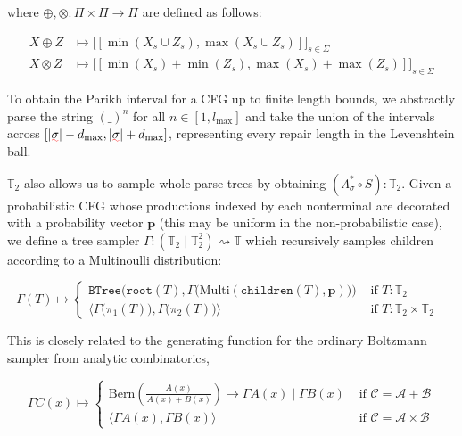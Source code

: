 \documentclass[sigplan,review,anonymous,acmsmall]{acmart}\settopmatter{printfolios=false,printccs=false,printacmref=false}
\begin{document}
  \noindent where $\oplus, \otimes: \Pi \times \Pi \rightarrow \Pi$ are defined as follows:

  \begin{align}
      X \oplus Z &\mapsto \big[[\min(X_s \cup Z_s), \max(X_s \cup Z_s)]\big]_{s \in \Sigma}\\ X \otimes Z &\mapsto \big[[\min(X_s) + \min(Z_s), \max(X_s) + \max(Z_s)]\big]_{s \in \Sigma}
  \end{align}

  To obtain the Parikh interval for a CFG up to finite length bounds, we abstractly parse the string $(\_)^n$ for all $n \in [1, l_{\max}]$ and take the union of the intervals across $[|\err\sigma| - d_{\max}, |\err\sigma| + d_{\max}]$, representing every repair length in the Levenshtein ball.

  $\mathbb{T}_2$ also allows us to sample whole parse trees by obtaining $(\Lambda_\sigma^* \circ S): \mathbb{T}_2$. Given a probabilistic CFG whose productions indexed by each nonterminal are decorated with a probability vector $\mathbf{p}$ (this may be uniform in the non-probabilistic case), we define a tree sampler $\Gamma: (\mathbb{T}_2 \mid \mathbb{T}_2^2) \rightsquigarrow \mathbb{T}$ which recursively samples children according to a Multinoulli distribution:

\begin{equation}
  \Gamma(T) \mapsto \begin{cases}
        \texttt{BTree}\Big(\texttt{root}(T), \Gamma\big(\text{Multi}(\texttt{children}(T), \mathbf{p})\big)\Big) & \text{ if $T: \mathbb{T}_2$ } \\
        \big\langle \Gamma\big(\pi_1(T)\big), \Gamma\big(\pi_2(T)\big) \big\rangle & \text{ if $T: \mathbb{T}_2\times\mathbb{T}_2$ }
  \end{cases}
\end{equation}

This is closely related to the generating function for the ordinary Boltzmann sampler from analytic combinatorics,

\begin{equation}
  \Gamma C(x) \mapsto \begin{cases}
  \text{Bern} \left(\frac{A(x)}{A(x) + B(x)}\right) \rightarrow \Gamma A(x) \mid \Gamma B(x) & \text{ if } \mathcal{C}=\mathcal{A}+\mathcal{B} \\
  \big\langle \Gamma A(x), \Gamma B(x)\big\rangle & \text{ if } \mathcal{C}=\mathcal{A} \times \mathcal{B}
  \end{cases}
\end{equation}
\end{document}
